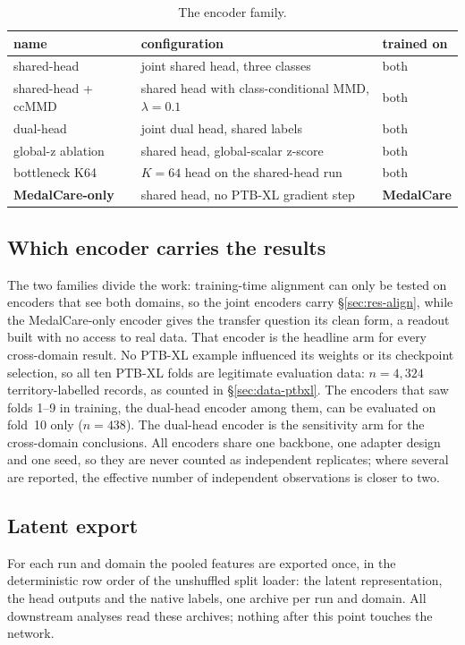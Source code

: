 \begin{table}[tb]
\centering\small
\caption{The encoder family.}
\label{tab:runs}
\begin{tabular}{lll}
\toprule
name & configuration & trained on \\
\midrule
shared-head & joint shared head, three classes & both \\
shared-head + ccMMD & shared head with class-conditional MMD, $\lambda=0.1$ & both \\
dual-head & joint dual head, shared labels & both \\
global-z ablation & shared head, global-scalar z-score & both \\
bottleneck K64 & $K=64$ head on the shared-head run & both \\
\textbf{MedalCare-only} & shared head, no PTB-XL gradient step & \textbf{MedalCare} \\
\bottomrule
\end{tabular}
\end{table}

\subsection{Which encoder carries the results}
The two families divide the work: training-time alignment can only be tested on encoders that see both domains, so the joint encoders carry \S\ref{sec:res-align}, while the MedalCare-only encoder gives the transfer question its clean form, a readout built with no access to real data. That encoder is the headline arm for every cross-domain result. No PTB-XL example influenced its weights or its checkpoint selection, so all ten PTB-XL folds are legitimate evaluation data: $n=4{,}324$ territory-labelled records, as counted in \S\ref{sec:data-ptbxl}. The encoders that saw folds 1--9 in training, the dual-head encoder among them, can be evaluated on fold~10 only ($n=438$). The dual-head encoder is the sensitivity arm for the cross-domain conclusions. All encoders share one backbone, one adapter design and one seed, so they are never counted as independent replicates; where several are reported, the effective number of independent observations is closer to two. 

\subsection{Latent export}
For each run and domain the pooled features are exported once, in the deterministic row order of the unshuffled split loader: the latent representation, the head outputs and the native labels, one archive per run and domain. All downstream analyses read these archives; nothing after this point touches the network. 


